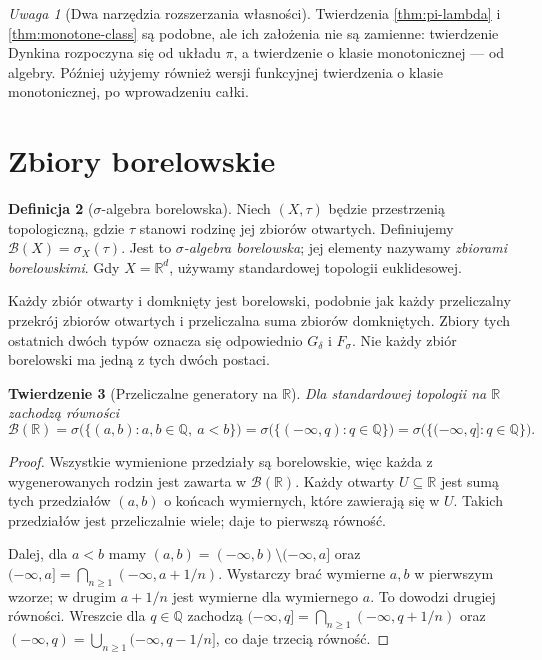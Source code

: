 \documentclass[11pt,a4paper,oneside]{book}
\numberwithin{equation}{chapter}
\theoremstyle{plain}
\newtheorem{twierdzenie}{Twierdzenie}[chapter]
\theoremstyle{definition}
\newtheorem{definicja}[twierdzenie]{Definicja}
\theoremstyle{remark}
\newtheorem{uwaga}[twierdzenie]{Uwaga}
\begin{document}
\begin{uwaga}[Dwa narzędzia rozszerzania własności]
Twierdzenia \ref{thm:pi-lambda} i \ref{thm:monotone-class} są podobne,
ale ich założenia nie są zamienne: twierdzenie Dynkina rozpoczyna się
od układu $\pi$, a twierdzenie o klasie monotonicznej --- od algebry.
Później użyjemy również wersji funkcyjnej twierdzenia o klasie
monotonicznej, po wprowadzeniu całki.
\end{uwaga}

\section{Zbiory borelowskie}

\begin{definicja}[$\sigma$-algebra borelowska]
\label{def:borel}
Niech $(X,\tau)$ będzie przestrzenią topologiczną, gdzie $\tau$
stanowi rodzinę jej zbiorów otwartych. Definiujemy
$\mathcal B(X)=\sigma_X(\tau)$.
Jest to \emph{$\sigma$-algebra borelowska}; jej elementy nazywamy
\emph{zbiorami borelowskimi}. Gdy $X=\mathbb R^d$, używamy standardowej
topologii euklidesowej.
\end{definicja}

Każdy zbiór otwarty i domknięty jest borelowski, podobnie jak każdy
przeliczalny przekrój zbiorów otwartych i przeliczalna suma zbiorów
domkniętych. Zbiory tych ostatnich dwóch typów oznacza się odpowiednio
$G_\delta$ i $F_\sigma$. Nie każdy zbiór borelowski ma jedną z tych
dwóch postaci.

\begin{twierdzenie}[Przeliczalne generatory na $\mathbb R$]
\label{thm:borel-generators-R}
Dla standardowej topologii na $\mathbb R$ zachodzą równości
\[
\mathcal B(\mathbb R)
=\sigma\bigl(\{(a,b):a,b\in\mathbb Q,\ a<b\}\bigr)
=\sigma\bigl(\{(-\infty,q):q\in\mathbb Q\}\bigr)
=\sigma\bigl(\{(-\infty,q]:q\in\mathbb Q\}\bigr).
\]
\end{twierdzenie}
\begin{proof}
Wszystkie wymienione przedziały są borelowskie, więc każda z
wygenerowanych rodzin jest zawarta w $\mathcal B(\mathbb R)$.
Każdy otwarty $U\subseteq\mathbb R$ jest sumą tych przedziałów
$(a,b)$ o końcach wymiernych, które zawierają się w $U$. Takich
przedziałów jest przeliczalnie wiele; daje to pierwszą równość.

Dalej, dla $a<b$ mamy $(a,b)=(-\infty,b)\setminus(-\infty,a]$ oraz
$(-\infty,a]=\bigcap_{n\geq1}(-\infty,a+1/n)$.
Wystarczy brać wymierne $a,b$ w pierwszym wzorze; w drugim
$a+1/n$ jest wymierne dla wymiernego $a$. To dowodzi drugiej
równości. Wreszcie dla $q\in\mathbb Q$ zachodzą
$(-\infty,q]=\bigcap_{n\geq1}(-\infty,q+1/n)$ oraz
$(-\infty,q)=\bigcup_{n\geq1}(-\infty,q-1/n]$,
co daje trzecią równość.
\end{proof}
\end{document}
